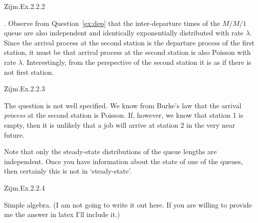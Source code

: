 \begin{question}
Zijm.Ex.2.2.2
\begin{solution}
  . Observe from Question~\ref{ex:dep} that the inter-departure times
  of the $M/M/1$ queue are also independent and identically
  exponentially distributed with rate $\lambda$. Since the arrival
  process at the second station is the departure process of the first
  station, it must be that arrival process at the second station is
  also Poisson with rate $\lambda$.  Interestingly, from the
  perspective of the second station it is as if there is not first
  station.
\end{solution}
\end{question}



\begin{question}
Zijm.Ex.2.2.3 
\begin{solution}
  The question is not well specified. We know from Burke's law that
  the arrival \emph{process} at the second station is Poisson.  If,
  however, we know that station 1 is empty, then it is unlikely that a
  job will arrive at station 2 in the very near future.

  Note that only the steady-state distributions of the queue lengths
  are independent. Once you have information about the state of one of
  the queues, then certainly this is not in `steady-state'.
\end{solution}
\end{question}

\begin{question}
Zijm.Ex.2.2.4
\begin{solution}
  Simple algebra.  (I am not going to write it out here. If you are
  willing to provide me the answer in latex I'll include it.)
\end{solution}
\end{question}

